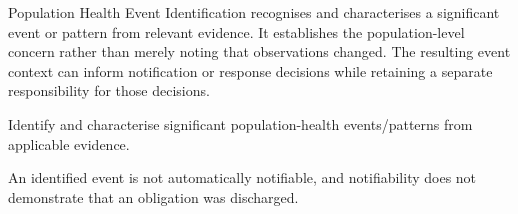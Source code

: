 Population Health Event Identification recognises and characterises a significant event or pattern from relevant evidence. It establishes the population-level concern rather than merely noting that observations changed. The resulting event context can inform notification or response decisions while retaining a separate responsibility for those decisions.



Identify and characterise significant population-health events/\allowbreak{}patterns from applicable evidence.



An identified event is not automatically notifiable, and notifiability does not demonstrate that an obligation was discharged.


